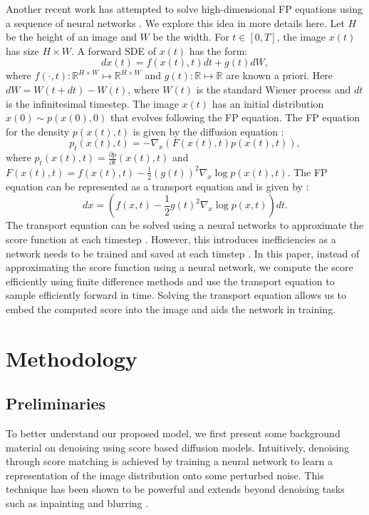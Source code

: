\documentclass[]{interact}
\theoremstyle{plain}%
\theoremstyle{definition}
\theoremstyle{remark}
\begin{document}
Another recent work has attempted to solve high-dimensional FP equations using a sequence of neural networks \cite{boffi-2022}. We explore this idea in more details here. Let $H$ be the height of an image and $W$ be the width. For $t \in [0, T]$, the image $x(t)$ has size $H \times W$. A forward SDE of $x(t)$ has the form:
\begin{equation}
    dx(t) = f(x(t),t)dt + g(t)dW,
    \label{eq:forward_sde}
\end{equation}
where $f(\cdot,t): \mathbb{R}^{H\times W}\mapsto \mathbb{R}^{H\times W}$ and $g(t): \mathbb{R}\mapsto \mathbb{R}$ are known a priori. Here $dW = W(t+dt) - W(t)$, where $W(t)$ is the standard Wiener process and $dt$ is the infinitesimal timestep. The image $x(t)$ has an initial distribution $x(0) \sim p(x(0),0)$ that evolves following the FP equation. The FP equation for the density $p(x(t),t)$ is given by the diffusion equation \cite{oksendal-1987}:
\begin{equation}
    p_t(x(t),t) = -\nabla_x(F(x(t),t) p(x(t),t)),
    \label{eq:FP}
\end{equation}
where $p_t(x(t),t) = \frac{\partial p}{\partial t}(x(t),t)$ and $F(x(t),t) = f(x(t),t) - \frac{1}{2}(g(t))^2\nabla_{x}\log p(x(t),t)$. The FP equation can be represented as a transport equation and is given by \cite{ysong-2020, boffi-2022}:
\begin{equation}
    dx = (f(x,t) - \frac{1}{2}g(t)^2 \nabla_x\log p(x,t))dt.
    \label{eq:probability_flow}
\end{equation}
The transport equation can be solved using a neural networks to approximate the score function at each timestep \cite{boffi-2022}. However, this introduces inefficiencies as a network needs to be trained and saved at each timstep \cite{na-2023}. In this paper, instead of approximating the score function using a neural network, we compute the score efficiently using finite difference methods and use the transport equation to sample efficiently forward in time. Solving the transport equation allows us to embed the computed score into the image and aids the network in training.

\section{Methodology} \label{sec:Background}
\subsection{Preliminaries}
To better understand our proposed model, we first present some background material on denoising using score based diffusion models. Intuitively, denoising through score matching is achieved by training a neural network to learn a representation of the image distribution onto some perturbed noise. This technique has been shown to be powerful and extends beyond denoising tasks such as inpainting and blurring \cite{daras-2022}.
\end{document}
